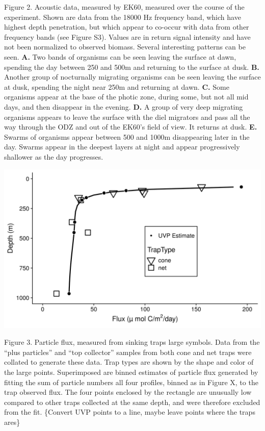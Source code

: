 \documentclass[]{article}
\begin{document}
Figure 2. Acoustic data, measured by EK60, measured over the course of
the experiment. Shown are data from the 18000 Hz frequency band, which
have highest depth penetration, but which appear to co-occur with data
from other frequency bands (see Figure S3). Values are in return signal
intensity and have not been normalized to observed biomass. Several
interesting patterns can be seen. \textbf{A.} Two bands of organisms can
be seen leaving the surface at dawn, spending the day between 250 and
500m and returning to the surface at dusk. \textbf{B.} Another group of
nocturnally migrating organisms can be seen leaving the surface at dusk,
spending the night near 250m and returning at dawn. \textbf{C.} Some
organisms appear at the base of the photic zone, during some, but not
all mid days, and then disappear in the evening. \textbf{D.} A group of
very deep migrating organisms appears to leave the surface with the diel
migrators and pass all the way through the ODZ and out of the EK60's
field of view. It returns at dusk. \textbf{E.} Swarms of organisms
appear between 500 and 1000m disappearing later in the day. Swarms
appear in the deepest layers at night and appear progressively shallower
as the day progresses.

\includegraphics{../figures/FittedFlux.png}

Figure 3. Particle flux, measured from sinking traps large symbols. Data
from the ``plus particles'' and ``top collector'' samples from both cone
and net traps were collated to generate these data. Trap types are shown
by the shape and color of the large points. Superimposed are binned
estimates of particle flux generated by fitting the sum of particle
numbers all four profiles, binned as in Figure X, to the trap observed
flux. The four points enclosed by the rectangle are unusually low
compared to other traps collected at the same depth, and were therefore
excluded from the fit. \{Convert UVP points to a line, maybe leave
points where the traps ares\}
\end{document}
